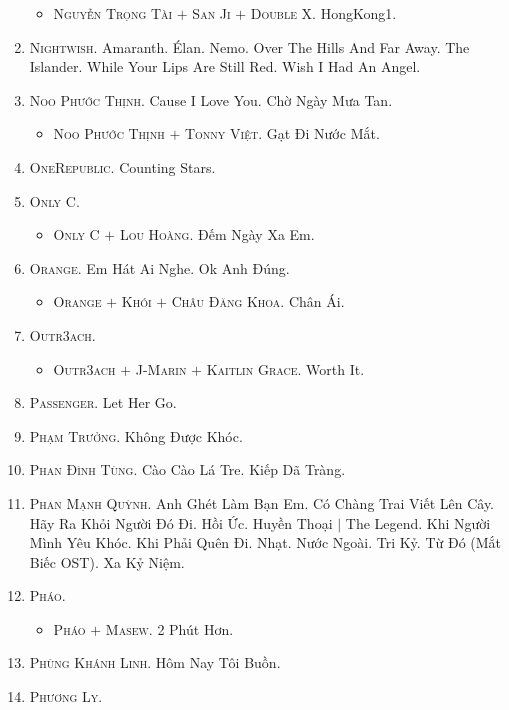 \documentclass[oneside]{book}
\numberwithin{equation}{section}
\begin{document}
\begin{enumerate}
	\begin{itemize}
		\item \textsc{Nguyễn Trọng Tài $+$ San Ji $+$ Double X.} HongKong1.
	\end{itemize}
	\item \textsc{Nightwish.} Amaranth. \'Elan. Nemo. Over The Hills And Far Away. The Islander. While Your Lips Are Still Red. Wish I Had An Angel.
	\item \textsc{Noo Phước Thịnh.} Cause I Love You. Chờ Ngày Mưa Tan.
	\begin{itemize}
		\item \textsc{Noo Phước Thịnh $+$ Tonny Việt.} Gạt Đi Nước Mắt.
	\end{itemize}
	\item \textsc{OneRepublic.} Counting Stars.
	\item \textsc{Only C.}
	\begin{itemize}
		\item \textsc{Only C $+$ Lou Hoàng.} Đếm Ngày Xa Em.
	\end{itemize}
	\item \textsc{Orange.} Em Hát Ai Nghe. Ok Anh Đúng.
	\begin{itemize}
		\item \textsc{Orange $+$ Khói $+$ Châu Đăng Khoa.} Chân Ái.
	\end{itemize}
	\item \textsc{Outr3ach.}
	\begin{itemize}
		\item \textsc{Outr3ach $+$ J-Marin $+$ Kaitlin Grace.} Worth It.
	\end{itemize}
	\item \textsc{Passenger.} Let Her Go.
	\item \textsc{Phạm Trưởng.} Không Được Khóc.
	\item \textsc{Phan Đình Tùng.} Cào Cào Lá Tre. Kiếp Dã Tràng.
	\item \textsc{Phan Mạnh Quỳnh.} Anh Ghét Làm Bạn Em. Có Chàng Trai Viết Lên Cây. Hãy Ra Khỏi Người Đó Đi. Hồi Ức. Huyền Thoại $|$ The Legend. Khi Người Mình Yêu Khóc. Khi Phải Quên Đi. Nhạt. Nước Ngoài. Tri Kỷ. Từ Đó (Mắt Biếc OST). Xa Kỷ Niệm.
	\item \textsc{Pháo.}
	\begin{itemize}
		\item \textsc{Pháo $+$ Masew.} 2 Phút Hơn.
	\end{itemize}
	\item \textsc{Phùng Khánh Linh.} Hôm Nay Tôi Buồn.
	\item \textsc{Phương Ly.}

\end{enumerate}
\end{document}
